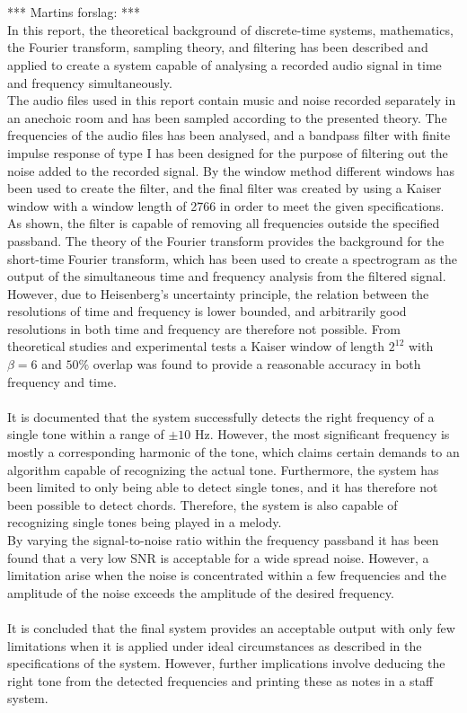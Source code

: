 \\ \\
*** Martins forslag: *** \\
In this report, the theoretical background of discrete-time systems, mathematics, the Fourier transform, sampling theory, and filtering has been described and applied to create a system capable of analysing a recorded audio signal in time and frequency simultaneously.
\\
The audio files used in this report contain music and noise recorded separately in an anechoic room and has been sampled according to the presented theory. The frequencies of the audio files has been analysed, and a bandpass filter with finite impulse response of type I has been designed for the purpose of filtering out the noise added to the recorded signal. By the window method different windows has been used to create the filter, and the final filter was created by using a Kaiser window with a window length of 2766 in order to meet the given specifications. As shown, the filter is capable of removing all frequencies outside the specified passband. The theory of the Fourier transform provides the background for the short-time Fourier transform, which has been used to create a spectrogram as the output of the simultaneous time and frequency analysis from the filtered signal. However, due to Heisenberg's uncertainty principle, the relation between the resolutions of time and frequency is lower bounded, and arbitrarily good resolutions in both time and frequency are therefore not possible. From theoretical studies and experimental tests a Kaiser window of length $2^{12}$ with $\beta = 6$ and $50\%$ overlap was found to provide a reasonable accuracy in both frequency and time.
\\ \\
It is documented that the system successfully detects the right frequency of a single tone within a range of $\pm 10$ Hz. However, the most significant frequency is mostly a corresponding harmonic of the tone, which claims certain demands to an algorithm capable of recognizing the actual tone. Furthermore, the system has been limited to only being able to detect single tones, and it has therefore not been possible to detect chords. Therefore, the system is also capable of recognizing single tones being played in a melody.
\\
By varying the signal-to-noise ratio within the frequency  passband it has been found that a very low SNR is acceptable for a wide spread noise. However, a limitation arise when the noise is concentrated within a few frequencies and the amplitude of the noise exceeds the amplitude of the desired frequency.
\\ \\
It is concluded that the final system provides an acceptable output with only few limitations when it is applied under ideal circumstances as described in the specifications of the system. However, further implications involve deducing the right tone from the detected frequencies and printing these as notes in a staff system.

 
